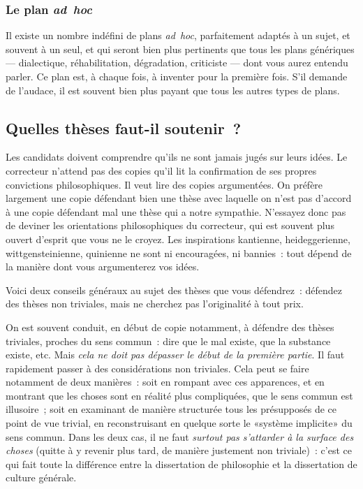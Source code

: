 \documentclass[a4paper,11pt]{article}
\begin{document}
\subsubsection{Le plan \emph{ad~hoc}}

Il existe un nombre indéfini de plans \emph{ad~hoc}, parfaitement
adaptés à un sujet, et souvent à un seul, et qui seront bien plus
pertinents que tous les plans génériques --- dialectique,
réhabilitation, dégradation, criticiste --- dont vous aurez entendu
parler. Ce plan est, à chaque fois, à inventer pour la première
fois. S'il demande de l'audace, il est souvent bien plus payant que tous
les autres types de plans.


\subsection{Quelles thèses faut-il soutenir~?}

Les candidats doivent comprendre qu'ils ne sont jamais jugés sur leurs
idées. Le correcteur n'attend pas des copies qu'il lit la confirmation
de ses propres convictions philosophiques. Il veut lire des copies
argumentées. On préfère largement une copie défendant bien une thèse
avec laquelle on n'est pas d'accord à une copie défendant mal une thèse
qui a notre sympathie. N'essayez donc pas de deviner les orientations
philosophiques du correcteur, qui est souvent plus ouvert d'esprit que
vous ne le croyez. Les inspirations kantienne, heideggerienne,
wittgensteinienne, quinienne ne sont ni encouragées, ni bannies~: tout
dépend de la manière dont vous argumenterez vos idées.

\par

Voici deux conseils généraux au sujet des thèses que vous défendrez~:
défendez des thèses non triviales, mais ne cherchez pas l'originalité à
tout prix.

\par

On est souvent conduit, en début de copie notamment, à défendre des
thèses triviales, proches du sens commun~: dire que le mal existe, que
la substance existe, etc. Mais \emph{cela ne doit pas dépasser le début
  de la première partie}. Il faut rapidement passer à des considérations
non triviales. Cela peut se faire notamment de deux manières~: soit en
rompant avec ces apparences, et en montrant que les choses sont en
réalité plus compliquées, que le sens commun est illusoire~; soit en
examinant de manière structurée tous les présupposés de ce point de vue
trivial, en reconstruisant en quelque sorte le «système implicite» du
sens commun. Dans les deux cas, il ne faut \emph{surtout pas s'attarder
  à la surface des choses} (quitte à y revenir plus tard, de manière
justement non triviale)~: c'est ce qui fait toute la différence entre la
dissertation de philosophie et la dissertation de culture générale.
\end{document}
